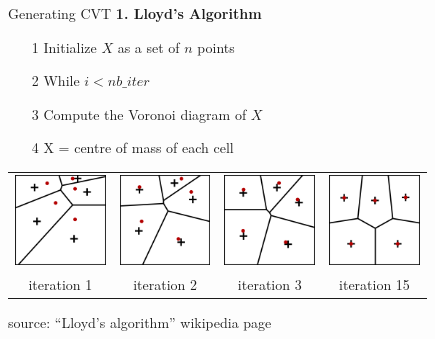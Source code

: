 \begin{frame}{Generating CVT }
\textbf{1. Lloyd's Algorithm}
\begin{itemize}
	\item[1] Initialize $X$ as a set of $n$ points
	\item[2] While $i<nb\_iter$
	\item[3] \qquad Compute the Voronoi diagram of $X$
	\item[4] \qquad X = centre of mass of each cell
\end{itemize}
\begin{center}
  \begin{tabular}{cccc}
\includegraphics[height=2.4cm]{2_Design_of_experiments/figures/Lloyds1}&
\includegraphics[height=2.4cm]{2_Design_of_experiments/figures/Lloyds2}&
\includegraphics[height=2.4cm]{2_Design_of_experiments/figures/Lloyds3}&
\includegraphics[height=2.4cm]{2_Design_of_experiments/figures/Lloyds15}\\
iteration 1 & iteration 2 &iteration 3 &iteration 15
  \end{tabular}
\end{center}
source: ``Lloyd's algorithm'' wikipedia page
\end{frame}

